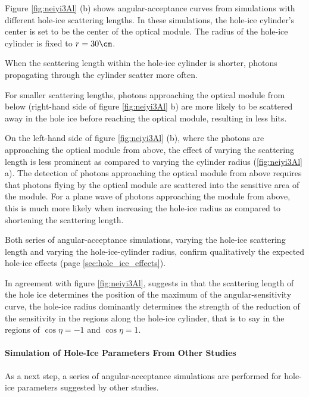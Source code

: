 
Figure \ref{fig:neiyi3Al} (b) shows angular-acceptance curves from simulations with different hole-ice scattering lengths. In these simulations, the hole-ice cylinder's center is set to be the center of the optical module. The radius of the hole-ice cylinder is fixed to $r = 30\cm$.

When the scattering length within the hole-ice cylinder is shorter, photons propagating through the cylinder scatter more often.

For smaller scattering lengths, photons approaching the optical module from below (right-hand side of figure \ref{fig:neiyi3Al} b) are more likely to be scattered away in the hole ice before reaching the optical module, resulting in less hits.

On the left-hand side of figure \ref{fig:neiyi3Al} (b), where the photons are approaching the optical module from above, the effect of varying the scattering length is less prominent as compared to varying the cylinder radius (\ref{fig:neiyi3Al} a). The detection of photons approaching the optical module from above requires that photons flying by the optical module are scattered into the sensitive area of the module. For a plane wave of photons approaching the module from above, this is much more likely when increasing the hole-ice radius as compared to shortening the scattering length.

Both series of angular-acceptance simulations, varying the hole-ice scattering length and varying the hole-ice-cylinder radius, confirm qualitatively the expected hole-ice effects (page \ref{sec:hole_ice_effects}).

In agreement with figure \ref{fig:neiyi3Al}, \rongen suggests in \cite{pocam} %
that the scattering length of the hole ice determines the position of the maximum of the angular-sensitivity curve, the hole-ice radius dominantly determines the strength of the reduction of the sensitivity in the regions along the hole-ice cylinder, that is to say in the regions of $\cos \eta = -1$ and $\cos \eta = 1$.


\paragraph{Simulation of Hole-Ice Parameters From Other Studies}
As a next step, a series of angular-acceptance simulations are performed for hole-ice parameters suggested by other studies.

